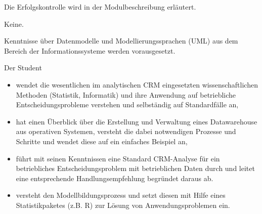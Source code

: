 \begin{course}

\setdoclanguagegerman
{}



\coursehead


\label{cour_4901.dp_997}


\begin{styleenv}
\begin{assessment}
Die Erfolgskontrolle wird in der Modulbeschreibung erläutert.


\end{assessment}

\begin{conditions}Keine.\end{conditions}

\begin{recommendations}Kenntnisse über Datenmodelle und Modellierungssprachen (UML) aus dem Bereich der Informationssysteme werden vorausgesetzt.

\end{recommendations}
\end{styleenv}

\begin{learningoutcomes}
Der Student

 \begin{itemize}\item wendet die wesentlichen im analytischen CRM eingesetzten wissenschaftlichen Methoden (Statistik, Informatik) und ihre Anwendung auf betriebliche Entscheidungsprobleme verstehen und selbständig auf Standardfälle an,  \item hat einen Überblick über die Erstellung und Verwaltung eines Datawarehouse aus operativen Systemen, versteht die dabei notwendigen Prozesse und Schritte und wendet diese auf ein einfaches Beispiel an,  \item führt mit seinen Kenntnissen eine Standard CRM-Analyse für ein betriebliches Entscheidungsproblem mit betrieblichen Daten durch und leitet eine entsprechende Handlungsempfehlung begründet daraus ab.  \item versteht den Modellbildungsprozess und setzt diesen mit Hilfe eines Statistikpaketes (z.B. R) zur Lösung von Anwendungsproblemen ein.  \end{itemize}
\end{learningoutcomes}


\end{course}
